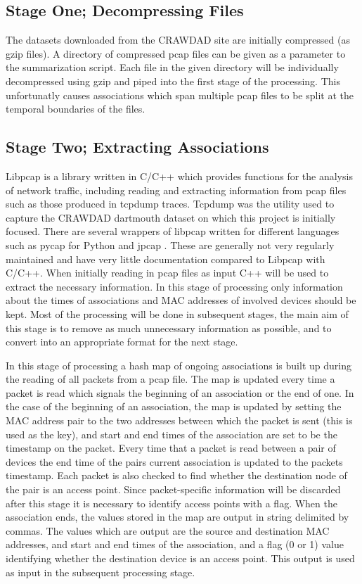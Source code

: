 \subsection{Stage One; Decompressing Files}

The datasets downloaded from the CRAWDAD site are initially compressed (as gzip files). A directory of compressed pcap files can be given as a parameter to the summarization script. Each file in the given directory will be individually decompressed using gzip \cite{} and piped into the first stage of the processing. This unfortunatly causes associations which span multiple pcap files to be split at the temporal boundaries of the files.

\subsection{Stage Two; Extracting Associations}

Libpcap is a library written in C/C++ which provides functions for the analysis of network traffic, including reading and extracting information from pcap files such as those produced in tcpdump traces. Tcpdump was the utility used to capture the CRAWDAD dartmouth dataset on which this project is initially focused. There are several wrappers of libpcap written for different languages such as pycap \cite{pynetwork2019} for Python and jpcap \cite{charles2013}. These are generally not very regularly maintained and have very little documentation compared to Libpcap with C/C++. When initially reading in pcap files as input C++ will be used to extract the necessary information. In this stage of processing only information about the times of associations and MAC addresses of involved devices should be kept. Most of the processing will be done in subsequent stages, the main aim of this stage is to remove as much unnecessary information as possible, and to convert into an appropriate format for the next stage.

In this stage of processing a hash map of ongoing associations is built up during the reading of all packets from a pcap file. The map is updated every time a packet is read which signals the beginning of an association or the end of one. In the case of the beginning of an association, the map is updated by setting the MAC address pair to the two addresses between which the packet is sent (this is used as the key), and start and end times of the association are set to be the timestamp on the packet. Every time that a packet is read between a pair of devices the end time of the pairs current association is updated to the packets timestamp. Each packet is also checked to find whether the destination node of the pair is an access point. Since packet-specific information will be discarded after this stage it is necessary to identify access points with a flag. When the association ends, the values stored in the map are output in string delimited by commas. The values which are output are the source and destination MAC addresses, and start and end times of the association, and a flag (0 or 1) value identifying whether the destination device is an access point. This output is used as input in the subsequent processing stage.

